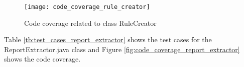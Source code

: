 \begin{figure}[h]
	\centering
	\texttt{[image: code\_coverage\_rule\_creator]}
	\caption{Code coverage related to class RuleCreator}\label{fig:code_coverage_rule_creator}
\end{figure} 
Table \ref{tb:test_cases_report_extractor} shows the test cases for the ReportExtractor.java class and Figure \ref{fig:code_coverage_report_extractor} shows the code coverage.

	\thispagestyle{empty}
		\begingroup
		\centering
		\scriptsize
		\renewcommand{\arraystretch}{1,5} 
		\keepXColumns
